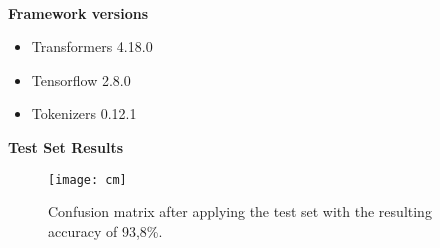 %
%
\\
\textbf{Framework versions}
\begin{itemize}
    \item Transformers 4.18.0
    \item Tensorflow 2.8.0
    \item Tokenizers 0.12.1
\end{itemize}%
%
\pagebreak
\textbf{Test Set Results}
\begin{figure}[h]
    \centering
    \texttt{[image: cm]}
    \caption{
        Confusion matrix after applying the test set with the resulting accuracy of 93,8\%.
    }
    \label{fig:cm}
\end{figure}
